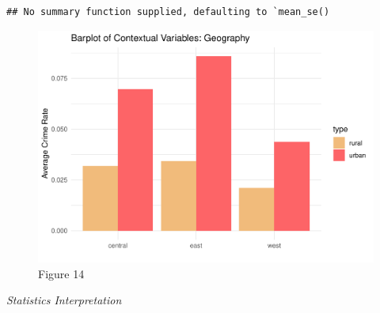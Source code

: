 \documentclass[]{article}
\begin{document}
\begin{verbatim}
## No summary function supplied, defaulting to `mean_se()
\end{verbatim}

\begin{figure}

{\centering \includegraphics{lab_3_final_files/figure-latex/unnamed-chunk-42-1} 

}

\caption{Figure 14}\label{fig:unnamed-chunk-42}
\end{figure}

\emph{Statistics Interpretation}
\end{document}
